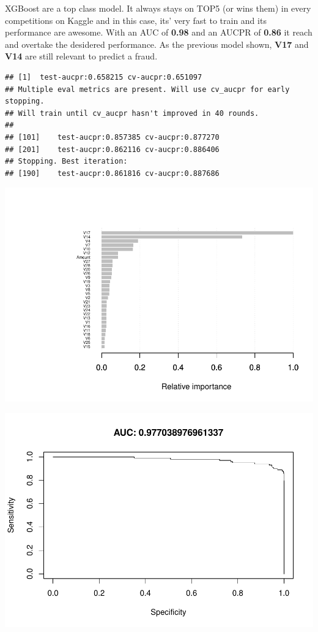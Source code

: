 \documentclass[]{article}
\begin{document}
XGBoost are a top class model. It always stays on TOP5 (or wins them) in
every competitions on Kaggle and in this case, its' very fast to train
and its performance are awesome. With an AUC of \textbf{0.98} and an
AUCPR of \textbf{0.86} it reach and overtake the desidered performance.
As the previous model shown, \textbf{V17} and \textbf{V14} are still
relevant to predict a fraud.

\begin{verbatim}
## [1]  test-aucpr:0.658215 cv-aucpr:0.651097 
## Multiple eval metrics are present. Will use cv_aucpr for early stopping.
## Will train until cv_aucpr hasn't improved in 40 rounds.
## 
## [101]    test-aucpr:0.857385 cv-aucpr:0.877270 
## [201]    test-aucpr:0.862116 cv-aucpr:0.886406 
## Stopping. Best iteration:
## [190]    test-aucpr:0.861816 cv-aucpr:0.887686
\end{verbatim}

\begin{center}\includegraphics{Credit_Card_Fraud_Detection_Project_Report_files/figure-latex/unnamed-chunk-22-1} \end{center}

\begin{center}\includegraphics{Credit_Card_Fraud_Detection_Project_Report_files/figure-latex/unnamed-chunk-22-2} \end{center}
\end{document}
